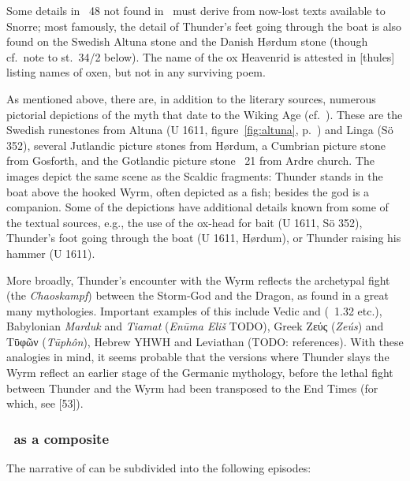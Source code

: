 Some details in \Gylfaginning~48 not found in \Hymiskvida\ must derive from now-lost texts available to Snorre; most famously, the detail of Thunder’s feet going through the boat is also found on the Swedish Altuna stone and the Danish Hørdum stone (though cf.~note to st.~34/2 below).  The name of the ox Heavenrid is attested in [thules] listing names of oxen, but not in any surviving poem.

As mentioned above, there are, in addition to the literary sources, numerous pictorial depictions of the myth that date to the Wiking Age (cf.~\cite[1062--1065]{Lindow2020Thorr}).  These are the Swedish runestones from Altuna (U 1611, figure~\ref{fig:altuna}, p.~\pageref{fig:altuna}) and Linga (Sö 352), several Jutlandic picture stones from Hørdum, a Cumbrian picture stone from Gosforth, and the Gotlandic picture stone \GP\ 21 from Ardre church.
The images depict the same scene as the Scaldic fragments: Thunder stands in the boat above the hooked Wyrm, often depicted as a fish; besides the god is a companion.  Some of the depictions have additional details known from some of the textual sources, e.g., the use of the ox-head for bait (U 1611, Sö 352), Thunder’s foot going through the boat (U 1611, Hørdum), or Thunder raising his hammer (U 1611).

More broadly, Thunder’s encounter with the Wyrm reflects the archetypal fight (the \emph{Chaos\-kampf}) between the Storm-God and the Dragon, as found in a great many mythologies.  Important examples of this include Vedic  and  (\Rigveda\ 1.32 etc.), Babylonian \emph{Marduk} and \emph{Tiamat} (\emph{Enūma Eliš} TODO), Greek \textgreek{Ζεύς} (\emph{Zeús}) and \textgreek{Τῡφῶν} (\emph{Tūphôn}), Hebrew YHWH and Leviathan (TODO: references).  With these analogies in mind, it seems probable that the versions where Thunder slays the Wyrm reflect an earlier stage of the Germanic mythology, before the lethal fight between Thunder and the Wyrm had been transposed to the End Times (for which, see [53]).

\subsubsection{\Hymiskvida\ as a composite}

The narrative of  can be subdivided into the following episodes:

